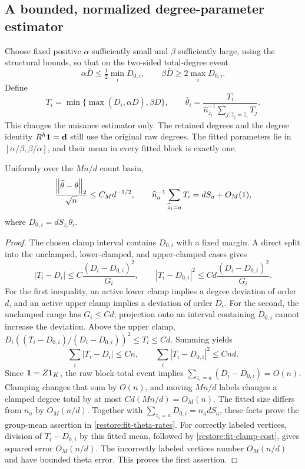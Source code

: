 \subsection{A bounded, normalized degree-parameter estimator}

Choose fixed positive $\alpha$ sufficiently small and $\beta$ sufficiently
large, using the structural bounds, so that on the two-sided
total-degree event
\[
 \alpha\overline D\le\tfrac12\min_iD_{0,i},\qquad
 \beta\overline D\ge2\max_iD_{0,i}.
\]
Define
\begin{equation}\label{restore:fit-clamped-theta}
 T_i=\min\{\max(D_i,\alpha\overline D),\beta\overline D\},
 \qquad
 \widehat\theta_i=
 \frac{T_i}{\widehat n_{\widehat z_i}^{-1}
                 \sum_{j:\widehat z_j=\widehat z_i}T_j}.
\end{equation}
This changes the nuisance estimator only. The retained degrees and the
degree identity $R^h\mathbf 1=\mathbf d$ still use the original raw degrees.
The fitted parameters lie in $[\alpha/\beta,\beta/\alpha]$, and their
mean in every fitted block is exactly one.

\begin{lemma}
\label{restore:fit-theta}
Uniformly over the $Mn/d$ count basin,
\begin{equation}\label{restore:fit-theta-rates}
 \frac{\left\lVert\widehat\theta-\theta\right\rVert_2}{\sqrt n}
        \le C_Md^{-1/2},\qquad
 \widehat n_a^{-1}\sum_{\widehat z_i=a}T_i
        =dS_a+O_M(1),
\end{equation}
where $D_{0,i}=dS_{z_i}\theta_i$.
\end{lemma}

\begin{proof}
The chosen clamp interval contains $D_{0,i}$ with a fixed margin.
A direct split into the unclamped, lower-clamped, and upper-clamped
cases gives
\[
 |T_i-D_i|\le C\frac{(D_i-D_{0,i})^2}{G_i},\qquad
 |T_i-D_{0,i}|^2\le Cd\frac{(D_i-D_{0,i})^2}{G_i}.
\]
For the first inequality, an active lower clamp implies a degree
deviation of order $d$, and an active upper clamp implies a deviation
of order $D_i$. For the second, the unclamped range has $G_i\le Cd$;
projection onto an interval containing $D_{0,i}$ cannot increase
the deviation. Above the upper clamp,
$D_i((T_i-D_{0,i})/(D_i-D_{0,i}))^2\le T_i\le Cd$.
Summing yields
\begin{equation}\label{restore:fit-clamp-cost}
 \sum_i|T_i-D_i|\le Cn,\qquad
 \sum_i|T_i-D_{0,i}|^2\le Cnd.
\end{equation}
Since $\mathbf 1=Z\mathbf 1_K$, the raw block-total event implies
$\sum_{z_i=a}(D_i-D_{0,i})=O(n)$.
Clamping changes that sum by $O(n)$, and moving $Mn/d$ labels changes
a clamped degree total by at most $Cd(Mn/d)=O_M(n)$.
The fitted size differs from $n_a$ by $O_M(n/d)$.
Together with $\sum_{z_i=a}D_{0,i}=n_adS_a$, these facts prove the
group-mean assertion in \eqref{restore:fit-theta-rates}.
For correctly labeled vertices, division of
$T_i-D_{0,i}$ by this fitted mean, followed by
\eqref{restore:fit-clamp-cost}, gives squared error $O_M(n/d)$.
The incorrectly labeled vertices number $O_M(n/d)$ and have bounded
theta error. This proves the first assertion.
\end{proof}

